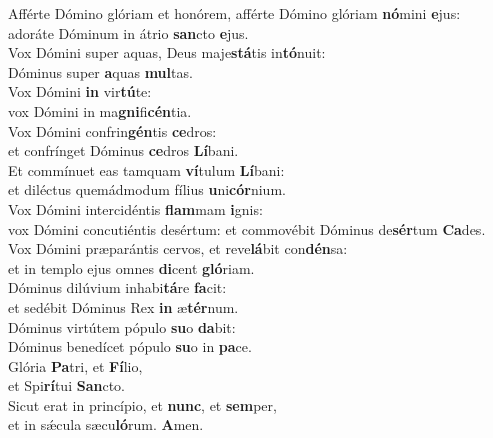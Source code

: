 \evenverse Afférte Dómino glóriam et honórem, afférte Dómino glóriam \textbf{nó}mini \textbf{e}jus:~\*\\
\evenverse adoráte Dóminum in átrio \textbf{san}cto \textbf{e}jus.\\
\oddverse Vox Dómini super aquas, Deus maje\textbf{stá}tis in\textbf{tó}nuit:~\*\\
\oddverse Dóminus super \textbf{a}quas \textbf{mul}tas.\\
\evenverse Vox Dómini \textbf{in} vir\textbf{tú}te:~\*\\
\evenverse vox Dómini in ma\textbf{gni}fi\textbf{cén}tia.\\
\oddverse Vox Dómini confrin\textbf{gén}tis \textbf{ce}dros:~\*\\
\oddverse et confrínget Dóminus \textbf{ce}dros \textbf{Lí}bani.\\
\evenverse Et commínuet eas tamquam \textbf{ví}tulum \textbf{Lí}bani:~\*\\
\evenverse et diléctus quemádmodum fílius \textbf{u}ni\textbf{cór}nium.\\
\oddverse Vox Dómini intercidéntis \textbf{flam}mam \textbf{i}gnis:~\*\\
\oddverse vox Dómini concutiéntis desértum: et commovébit Dóminus de\textbf{sér}tum \textbf{Ca}des.\\
\evenverse Vox Dómini præparántis cervos, et reve\textbf{lá}bit con\textbf{dén}sa:~\*\\
\evenverse et in templo ejus omnes \textbf{di}cent \textbf{gló}riam.\\
\oddverse Dóminus dilúvium inhabi\textbf{tá}re \textbf{fa}cit:~\*\\
\oddverse et sedébit Dóminus Rex \textbf{in} æ\textbf{tér}num.\\
\evenverse Dóminus virtútem pópulo \textbf{su}o \textbf{da}bit:~\*\\
\evenverse Dóminus benedícet pópulo \textbf{su}o in \textbf{pa}ce.\\
\oddverse Glória \textbf{Pa}tri, et \textbf{Fí}lio,~\*\\
\oddverse et Spi\textbf{rí}tui \textbf{San}cto.\\
\evenverse Sicut erat in princípio, et \textbf{nunc}, et \textbf{sem}per,~\*\\
\evenverse et in sǽcula sæcu\textbf{ló}rum. \textbf{A}men.\\
